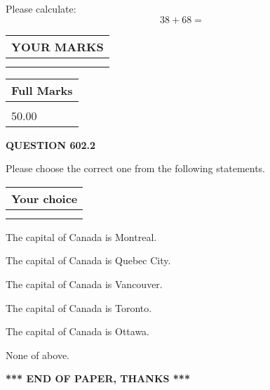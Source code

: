 \documentclass[12pt]{article}
\begin{document}
  
 
Please calculate:
\begin{equation}
38 +  %
68 = \nonumber
\end{equation}
 

 

 
  
\vspace{0.2in}
  
\noindent\begin{tabular}{|l|}
\hline
 YOUR MARKS  \\
\hline
 \\ 
 \\ 
\hline
\end{tabular}
\hspace{0.05in} \begin{tabular}{|l|}
\hline
 Full Marks  \\
\hline
 \\ 
50.00 \\
\hline
\end{tabular}
{\textbf{\Large{QUESTION
602.2 
}}}
  
  
Please choose the correct one from the following statements.
  
  
\noindent\hspace{3.0in} \begin{tabular}{|l|}
\hline
Your choice \\
\hline
 \\ 
 \\ 
\hline
\end{tabular}
  
  
 
 
The capital of Canada is Montreal.
 
 
The capital of Canada is Quebec City.
 
 
The capital of Canada is Vancouver.
 
 
The capital of Canada is Toronto.
 
 
The capital of Canada is Ottawa.
 
 
 None of above.
 
 
   
   
 \vspace{0.2in}
 
   
   
   
   
\vspace{1.0in} 
{\textbf{\large{ *** END OF PAPER, THANKS *** }}} 
   
\end{document}
